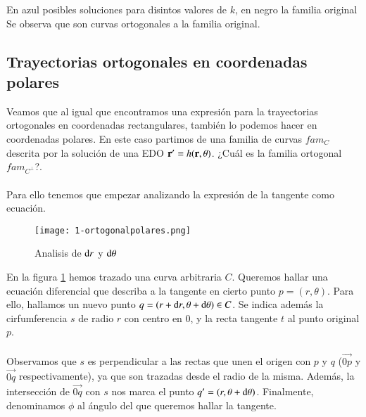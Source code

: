 \begin{eg}
\begin{center}
\hfill \break
        \vspace{1pt}
        En azul posibles soluciones para disintos valores de $k$, en negro la familia original\\
        Se observa que son curvas ortogonales a la familia original.
    \end{center}
\end{eg}

\subsection{Trayectorias ortogonales en coordenadas polares}
Veamos que al igual que encontramos una expresión para la trayectorias ortogonales en coordenadas rectangulares, también lo podemos hacer en coordenadas polares. En este caso partimos de una familia de curvas $fam_C$ descrita por la solución de una EDO $\mathbf{r'} = h(\mathbf{r}, \theta)$. ¿Cuál es la familia ortogonal $fam_{C^\perp}$?.\\\\
Para ello tenemos que empezar analizando la expresión de la tangente como ecuación.

\begin{wrapfigure}{l}{.6\textwidth}
  \begin{center}
    \texttt{[image: 1-ortogonalpolares.png]}
  \end{center}
  \caption{Analisis de $\mathrm{d} r$ y $\mathrm{d} \theta$}\label{img:1-polort}
\end{wrapfigure}
En la figura \ref{img:1-polort} hemos trazado una curva arbitraria $C$. Queremos hallar una ecuación diferencial que describa a la tangente en cierto punto $p = (r,\theta)$. Para ello, hallamos un nuevo punto $q = (r + \mathrm{d} r, \theta +\mathrm{d} \theta) \in C$. Se indica además la cirfumferencia $s$ de radio $r$ con centro en $0$, y la recta tangente $t$ al punto original $p$.\\\\
Observamos que $s$ es perpendicular a las rectas que unen el origen con $p$ y $q$ ($\vec{0p}$ y $\vec{0q}$ respectivamente), ya que son trazadas desde el radio de la misma. Además, la intersección de $\vec{0q}$ con $s$ nos marca el punto $q' = (r, \theta +\mathrm{d} \theta)$. Finalmente, denominamos $\phi$ al ángulo del que queremos hallar la tangente.


